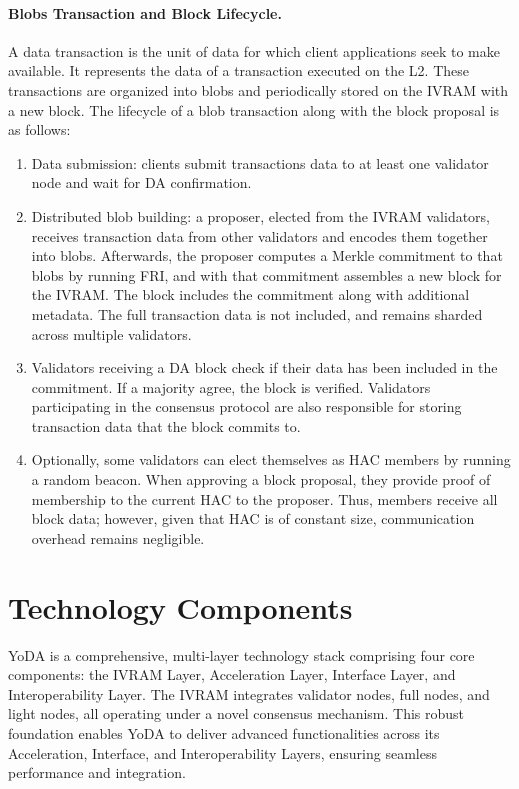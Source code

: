 \documentclass[11pt]{article}
\begin{document}
\paragraph{Blobs Transaction and Block Lifecycle.} A data transaction is the unit of data for which client applications seek to make available. It represents the data of a transaction executed on the L2. These transactions are organized into blobs and periodically stored on the IVRAM with a new block. The lifecycle of a blob transaction along with the block proposal is as follows:

\begin{enumerate}
    \item Data submission: clients submit transactions data to at least one validator node and wait for DA confirmation.
    \item Distributed blob building: a proposer, elected from the IVRAM validators, receives transaction data from other validators and encodes them together into blobs. Afterwards, the proposer computes a Merkle commitment to that blobs by running FRI, and with that commitment assembles a new block for the IVRAM. The block includes the commitment along with additional metadata. The full transaction data is not included, and remains sharded across multiple validators.
    \item Validators receiving a DA block check if their data has been included in the commitment. If a majority agree, the block is verified. Validators participating in the consensus protocol are also responsible for storing transaction data that the block commits to.
    \item Optionally, some validators can elect themselves as HAC members by running a random beacon. When approving a block proposal, they provide proof of membership to the current HAC to the proposer. Thus, members receive all block data; however, given that HAC is of constant size, communication overhead remains negligible.
\end{enumerate}

\section{Technology Components}
YoDA is a comprehensive, multi-layer technology stack comprising four core components: the IVRAM Layer, Acceleration Layer, Interface Layer, and Interoperability Layer. The IVRAM integrates validator nodes, full nodes, and light nodes, all operating under a novel consensus mechanism. This robust foundation enables YoDA to deliver advanced functionalities across its Acceleration, Interface, and Interoperability Layers, ensuring seamless performance and integration.
\end{document}
